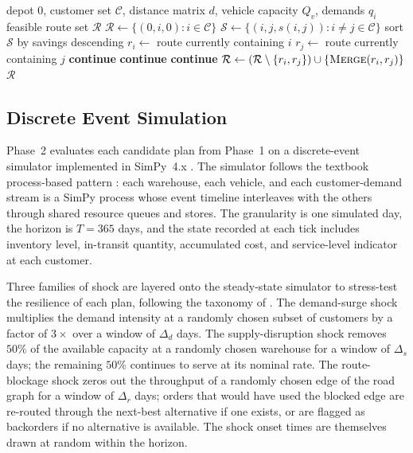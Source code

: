 \documentclass[review,preprint,authoryear,12pt]{elsarticle}
\begin{document}
\begin{algorithm}[H]
\caption{Parallel Clarke--Wright Savings}
\label{alg:cw}
\begin{algorithmic}[1]
\Require depot $0$, customer set $\mathcal{C}$, distance matrix $d$, vehicle capacity $Q_v$, demands $q_i$
\Ensure feasible route set $\mathcal{R}$
\State $\mathcal{R} \gets \{(0, i, 0) : i \in \mathcal{C}\}$ 
\State $\mathcal{S} \gets \{(i, j, s(i,j)) : i \neq j \in \mathcal{C}\}$
\State sort $\mathcal{S}$ by savings descending
  \State $r_i \gets$ route currently containing $i$
  \State $r_j \gets$ route currently containing $j$
   \textbf{continue} 
  \EndIf
   \textbf{continue} 
  \EndIf
   \textbf{continue} 
  \EndIf
  \State $\mathcal{R} \gets (\mathcal{R} \setminus \{r_i, r_j\}) \cup \{\textsc{Merge}(r_i, r_j)\}$
\EndFor
\State \Return $\mathcal{R}$
\end{algorithmic}
\end{algorithm}

\subsection{Discrete Event Simulation}
\label{sec:methodology:des}

Phase~2 evaluates each candidate plan from Phase~1 on a discrete-event
simulator implemented in SimPy~4.x \citep{simpy41_docs}. The simulator
follows the textbook process-based pattern \citep{banks2010des}: each
warehouse, each vehicle, and each customer-demand stream is a SimPy
process whose event timeline interleaves with the others through
shared resource queues and stores. The granularity is one simulated
day, the horizon is $T = 365$ days, and the state recorded at each
tick includes inventory level, in-transit quantity, accumulated cost,
and service-level indicator at each customer.

Three families of shock are layered onto the steady-state simulator
to stress-test the resilience of each plan, following the taxonomy of
\citet{sheffi2005resilient}. The demand-surge shock multiplies the
demand intensity at a randomly chosen subset of customers by a factor
of $3\times$ over a window of $\Delta_d$ days. The supply-disruption
shock removes $50\%$ of the available capacity at a randomly chosen
warehouse for a window of $\Delta_s$ days; the remaining $50\%$
continues to serve at its nominal rate. The route-blockage shock
zeros out the throughput of a randomly chosen edge of the road graph
for a window of $\Delta_r$ days; orders that would have used the
blocked edge are re-routed through the next-best alternative if one
exists, or are flagged as backorders if no alternative is available.
The shock onset times are themselves drawn at random within the
horizon.
\end{document}
